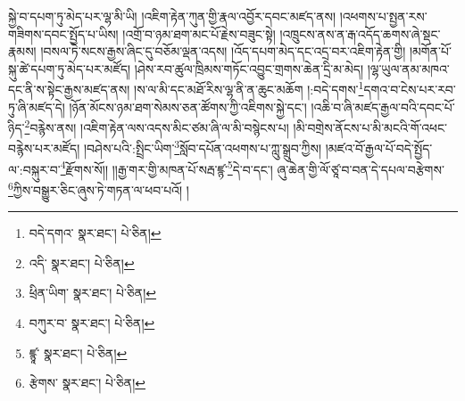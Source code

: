 སྐྱེ་བ་དཔག་ཏུ་མེད་པར་ལྷ་མི་ཡི། །འཇིག་རྟེན་ཀུན་གྱི་རྣལ་འབྱོར་དབང་མཛད་ནས། །འཕགས་པ་སྤྱན་རས་གཟིགས་དབང་སྤྱོད་པ་ཡིས། །འགྲོ་བ་ཉམ་ཐག་མང་པོ་རྗེས་བཟུང་སྟེ། །འཁྲུངས་ནས་ན་རྒ་འདོད་ཆགས་ཞེ་སྡང་རྣམས། །བསལ་ཏེ་སངས་རྒྱས་ཞིང་དུ་བཅོམ་ལྡན་འདས། །འོད་དཔག་མེད་དང་འདྲ་བར་འཇིག་རྟེན་གྱི། །མགོན་པོ་སྐུ་ཚེ་དཔག་ཏུ་མེད་པར་མཛོད། །ཤེས་རབ་ཚུལ་ཁྲིམས་གཏོང་འབྱུང་གྲགས་ཆེན་དྲི་མ་མེད། །ལྷ་ཡུལ་ནམ་མཁའ་དང་ནི་ས་སྟེང་རྒྱས་མཛད་ནས། །ས་ལ་མི་དང་མཐོ་རིས་ལྷ་ནི་ན་ཆུང་མཆོག །:བདེ་དགས་\footnote{བདེ་དགའ་  སྣར་ཐང་།  པེ་ཅིན། }དགའ་བ་ངེས་པར་རབ་ཏུ་ཞི་མཛད་དེ། །ཉོན་མོངས་ཉམ་ཐག་སེམས་ཅན་ཚོགས་ཀྱི་འཇིགས་སྐྱེ་དང་། །འཆི་བ་ཞི་མཛད་རྒྱལ་བའི་དབང་པོ་ཉིད་\footnote{འདི་  སྣར་ཐང་།  པེ་ཅིན། }བརྙེས་ནས། །འཇིག་རྟེན་ལས་འདས་མིང་ཙམ་ཞི་ལ་མི་བསྙེངས་པ། །མི་བགྲེས་ནོངས་པ་མི་མངའི་གོ་འཕང་བརྙེས་པར་མཛོད། །བཤེས་པའི་:སྤྲིང་ཡིག་\footnote{ཕྲིན་ཡིག་  སྣར་ཐང་།  པེ་ཅིན། }སློབ་དཔོན་འཕགས་པ་ཀླུ་སྒྲུབ་ཀྱིས། །མཛའ་བོ་རྒྱལ་པོ་བདེ་སྤྱོད་ལ་:བསྐུར་བ་\footnote{བཀུར་བ་  སྣར་ཐང་།  པེ་ཅིན། }རྫོགས་སོ།། །།རྒྱ་གར་གྱི་མཁན་པོ་སརྦ་ཛྙ་\footnote{ཛྙཱ་  སྣར་ཐང་།  པེ་ཅིན། }དེ་བ་དང་། ཞུ་ཆེན་གྱི་ལོ་ཙཱ་བ་བན་དེ་དཔལ་བརྩེགས་\footnote{རྩེགས་  སྣར་ཐང་།  པེ་ཅིན། }ཀྱིས་བསྒྱུར་ཅིང་ཞུས་ཏེ་གཏན་ལ་ཕབ་པའོ། ། 